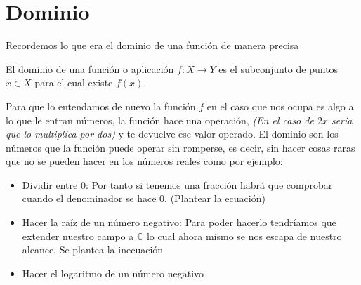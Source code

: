 \section{Dominio}
Recordemos lo que era el dominio de una función de manera precisa
\begin{defi}
El dominio de una función o aplicación $f: X\longrightarrow Y$ es el subconjunto de puntos $x \in X$ para el cual existe $f(x)$. 
\end{defi}
\noindent
Para que lo entendamos de nuevo la función $f$ en el caso que nos ocupa es algo a lo que le entran números, la función hace una operación, \emph{(En el caso de $2x$ sería que lo multiplica por dos)} y te devuelve ese valor operado. 
\noindent
El dominio son los números que la función puede operar sin  romperse, es decir, sin hacer cosas raras que no se pueden hacer en los números reales como por ejemplo:
\begin{itemize}
\item Dividir entre 0: Por tanto si tenemos una fracción habrá que comprobar cuando el denominador se hace 0. (Plantear la ecuación)
\item Hacer la raíz de un número negativo: Para poder hacerlo tendríamos que extender nuestro campo a $\mathbb{C}$ lo cual ahora mismo se nos escapa de nuestro alcance. Se plantea la inecuación
\item Hacer el logaritmo de un número negativo 
\end{itemize}

